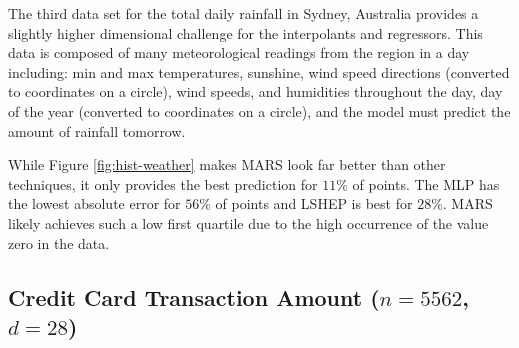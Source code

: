 The third data set for the total daily rainfall in Sydney, Australia
\cite{williams2009rattle} provides a slightly higher dimensional
challenge for the interpolants and regressors. This data is composed
of many meteorological readings from the region in a day including:
min and max temperatures, sunshine, wind speed directions (converted
to coordinates on a circle), wind speeds, and humidities throughout
the day, day of the year (converted to coordinates on a circle), and
the model must predict the amount of rainfall tomorrow.

While Figure \ref{fig:hist-weather} makes MARS look far better than
other techniques, it only provides the best prediction for $11\%$ of
points. The MLP has the lowest absolute error for $56\%$ of points and
LSHEP is best for $28\%$. MARS likely achieves such a low first
quartile due to the high occurrence of the value zero in the data.



\subsection{Credit Card Transaction Amount ($n = 5562$, $d = 28$)}

